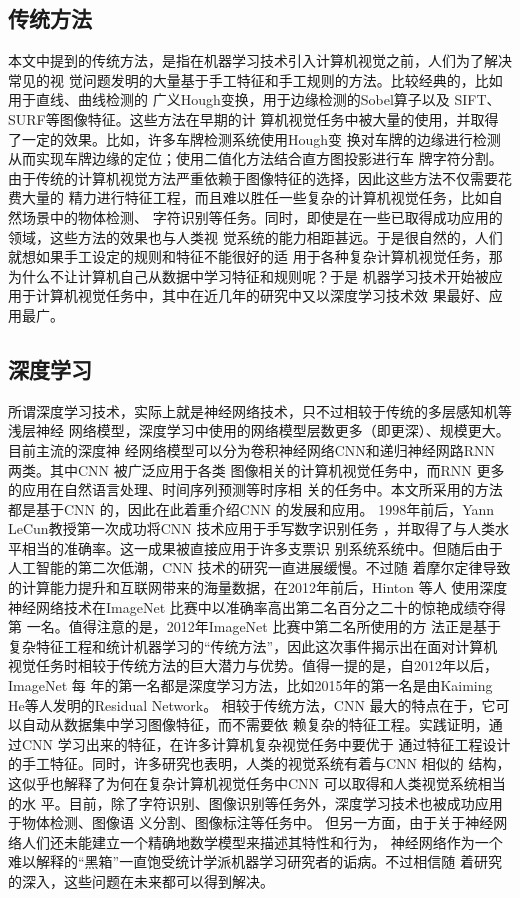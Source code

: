 \subsection{传统方法}
本文中提到的传统方法，是指在机器学习技术引入计算机视觉之前，人们为了解决常见的视
觉问题发明的大量基于手工特征和手工规则的方法。比较经典的，比如用于直线、曲线检测的
广义Hough变换\cite{Duda:1972eu}，用于边缘检测的Sobel算子以及
SIFT\cite{Lowe:2004kd}、SURF\cite{Baya:2008ud}等图像特征。这些方法在早期的计
算机视觉任务中被大量的使用，并取得了一定的效果。比如，许多车牌检测系统使用Hough变
换对车牌的边缘进行检测从而实现车牌边缘的定位；使用二值化方法结合直方图投影进行车
牌字符分割。
由于传统的计算机视觉方法严重依赖于图像特征的选择，因此这些方法不仅需要花费大量的
精力进行特征工程，而且难以胜任一些复杂的计算机视觉任务，比如自然场景中的物体检测、
字符识别等任务。同时，即使是在一些已取得成功应用的领域，这些方法的效果也与人类视
觉系统的能力相距甚远。于是很自然的，人们就想如果手工设定的规则和特征不能很好的适
用于各种复杂计算机视觉任务，那为什么不让计算机自己从数据中学习特征和规则呢？于是
机器学习技术开始被应用于计算机视觉任务中，其中在近几年的研究中又以深度学习技术效
果最好、应用最广。


\subsection{深度学习}
所谓深度学习技术，实际上就是神经网络技术，只不过相较于传统的多层感知机等浅层神经
网络模型，深度学习中使用的网络模型层数更多（即更深）、规模更大。目前主流的深度神
经网络模型可以分为卷积神经网络CNN和递归神经网路RNN 两类。其中CNN 被广泛应用于各类
图像相关的计算机视觉任务中，而RNN 更多的应用在自然语言处理、时间序列预测等时序相
关的任务中。本文所采用的方法都是基于CNN 的，因此在此着重介绍CNN 的发展和应用。
1998年前后，Yann LeCun教授第一次成功将CNN 技术应用于手写数字识别任务
\cite{LeCun:1990vp}，并取得了与人类水平相当的准确率。这一成果被直接应用于许多支票识
别系统系统中。但随后由于人工智能的第二次低潮，CNN 技术的研究一直进展缓慢。不过随
着摩尔定律导致的计算能力提升和互联网带来的海量数据，在2012年前后，Hinton 等人
使用深度神经网络技术在ImageNet 比赛中以准确率高出第二名百分之二十的惊艳成绩夺得第
一名\cite{Krizhevsky:2012wl}。值得注意的是，2012年ImageNet 比赛中第二名所使用的方
法正是基于复杂特征工程和统计机器学习的“传统方法”，因此这次事件揭示出在面对计算机
视觉任务时相较于传统方法的巨大潜力与优势。值得一提的是，自2012年以后，ImageNet 每
年的第一名都是深度学习方法，比如2015年的第一名是由Kaiming He等人发明的Residual
Network\cite{He:2015tt}。
相较于传统方法，CNN 最大的特点在于，它可以自动从数据集中学习图像特征，而不需要依
赖复杂的特征工程。实践证明，通过CNN 学习出来的特征，在许多计算机复杂视觉任务中要优于
通过特征工程设计的手工特征。同时，许多研究也表明，人类的视觉系统有着与CNN 相似的
结构，这似乎也解释了为何在复杂计算机视觉任务中CNN 可以取得和人类视觉系统相当的水
平。目前，除了字符识别、图像识别等任务外，深度学习技术也被成功应用于物体检测、图像语
义分割、图像标注等任务中。
但另一方面，由于关于神经网络人们还未能建立一个精确地数学模型来描述其特性和行为，
神经网络作为一个难以解释的“黑箱”一直饱受统计学派机器学习研究者的诟病。不过相信随
着研究的深入，这些问题在未来都可以得到解决。

